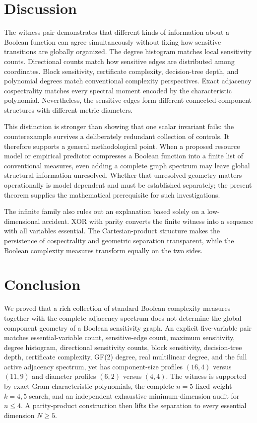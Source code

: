 \documentclass[twoside,12pt,letterpaper]{article}
\theoremstyle{definition}
\begin{document}
\section{Discussion}
The witness pair demonstrates that different kinds of information about a Boolean function can agree simultaneously without fixing how sensitive transitions are globally organized. The degree histogram matches local sensitivity counts. Directional counts match how sensitive edges are distributed among coordinates. Block sensitivity, certificate complexity, decision-tree depth, and polynomial degrees match conventional complexity perspectives. Exact adjacency cospectrality matches every spectral moment encoded by the characteristic polynomial. Nevertheless, the sensitive edges form different connected-component structures with different metric diameters.

This distinction is stronger than showing that one scalar invariant fails: the counterexample survives a deliberately redundant collection of controls. It therefore supports a general methodological point. When a proposed resource model or empirical predictor compresses a Boolean function into a finite list of conventional measures, even adding a complete graph spectrum may leave global structural information unresolved. Whether that unresolved geometry matters operationally is model dependent and must be established separately; the present theorem supplies the mathematical prerequisite for such investigations.

The infinite family also rules out an explanation based solely on a low-dimensional accident. XOR with parity converts the finite witness into a sequence with all variables essential. The Cartesian-product structure makes the persistence of cospectrality and geometric separation transparent, while the Boolean complexity measures transform equally on the two sides.

\section{Conclusion}
We proved that a rich collection of standard Boolean complexity measures together with the complete adjacency spectrum does not determine the global component geometry of a Boolean sensitivity graph. An explicit five-variable pair matches essential-variable count, sensitive-edge count, maximum sensitivity, degree histogram, directional sensitivity counts, block sensitivity, decision-tree depth, certificate complexity, GF(2) degree, real multilinear degree, and the full active adjacency spectrum, yet has component-size profiles $(16,4)$ versus $(11,9)$ and diameter profiles $(6,2)$ versus $(4,4)$. The witness is supported by exact Gram characteristic polynomials, the complete $n=5$ fixed-weight $k=4,5$ search, and an independent exhaustive minimum-dimension audit for $n\le4$. A parity-product construction then lifts the separation to every essential dimension $N\ge5$.
\end{document}

